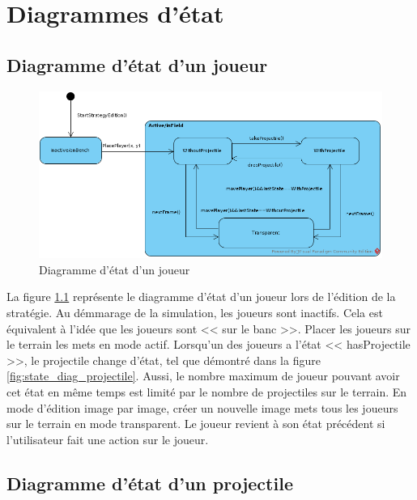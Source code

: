 
\chapter{Diagrammes d'état}
\label{s:diagrammes_etats}

\section{Diagramme d'état d'un joueur}
\label{sec:diagramme_etat_joueur}

\begin{figure}[htpb]
    \centering
    \includegraphics[scale=0.32]{fig/state_diag_player.png}
    \caption{Diagramme d'état d'un joueur}
    \label{fig:state_diag_player}
\end{figure}

La figure \ref{fig:state_diag_player} représente le diagramme d'état d'un joueur lors de l'édition de la stratégie.
Au démmarage de la simulation, les joueurs sont inactifs.
Cela est équivalent à l'idée que les joueurs sont << sur le banc >>.
Placer les joueurs sur le terrain les mets en mode actif.
Lorsqu'un des joueurs a l'état << hasProjectile >>, le projectile change d'état, tel que démontré dans la figure \ref{fig:state_diag_projectile}.
Aussi, le nombre maximum de joueur pouvant avoir cet état  en même temps est limité par le nombre de projectiles sur le terrain.
En mode d'édition image par image, créer un nouvelle image mets tous les joueurs sur le terrain en mode transparent.
Le joueur revient à son état précédent si l'utilisateur fait une action sur le joueur.

\section{Diagramme d'état d'un projectile}
\label{sec:diagramme_etat_projectile}

